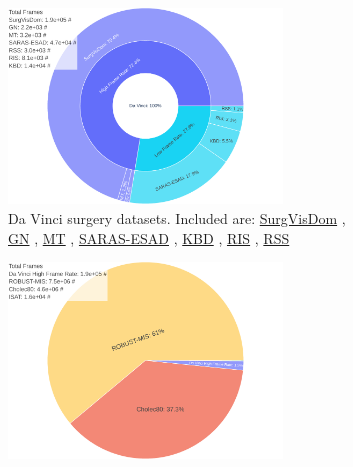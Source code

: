 \begin{figure}
\centering
\begin{subfigure}[b]{\textwidth}
    \centering
    \includegraphics[width=0.8\textwidth]{fig/fig_da_vinci.pdf}
    \caption{Da Vinci surgery datasets. Included are: \href{https://surgvisdom.grand-challenge.org/}{SurgVisDom} \cite{zia2021surgical}, \href{http://hamlyn.doc.ic.ac.uk/vision/}{GN} \cite{giannarou2012probabilistic}, \href{http://hamlyn.doc.ic.ac.uk/vision/}{MT} \cite{mountney2010three}, \href{https://saras-esad.grand-challenge.org/}{SARAS-ESAD} \cite{bawa2020esad}, \href{https://endovissub2017-kidneyboundarydetection.grand-challenge.org/}{KBD} \cite{hattab2020kidney}, \href{https://endovissub2017-roboticinstrumentsegmentation.grand-challenge.org/}{RIS} \cite{allan20192017}, \href{https://endovissub2018-roboticscenesegmentation.grand-challenge.org/home/}{RSS} \cite{allan20202018}}
    \label{c3:fig:data_a}
\end{subfigure}
\begin{subfigure}[b]{\textwidth}
    \centering
    \includegraphics[width=0.8\textwidth]{fig/fig_da_vinci_high_fps_laparoscopic.pdf}

\end{subfigure}
\end{figure}
